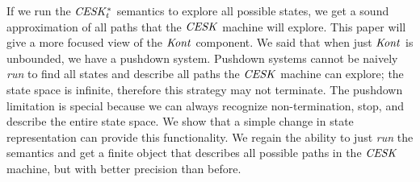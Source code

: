 If we run the $\mathit{CESK^*_t}$ semantics to explore all possible states, we get a sound approximation of all paths that the $\mathit{CESK}$ machine will explore.
%
This paper will give a more focused view of the $\mathit{Kont}$ component.
%
We said that when just $\mathit{Kont}$ is unbounded, we have a pushdown system.
%
Pushdown systems cannot be naively \emph{run} to find all states and describe all paths the $\mathit{CESK}$ machine can explore; the state space is infinite, therefore this strategy may not terminate.
%
The pushdown limitation is special because we can always recognize non-termination, stop, and describe the entire state space.
%
We show that a simple change in state representation can provide this functionality.
%
We regain the ability to just \emph{run} the semantics and get a finite object that describes all possible paths in the $\mathit{CESK}$ machine, but with better precision than before.